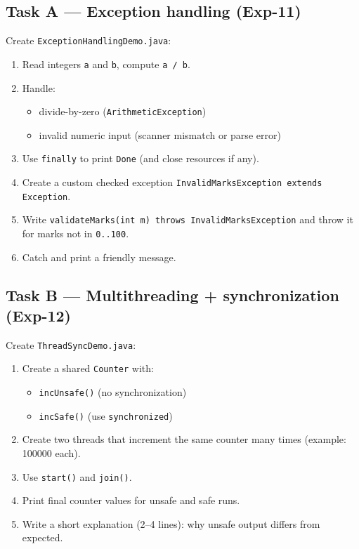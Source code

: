 \documentclass[11pt]{article}
\begin{document}
\subsection{Task A --- Exception handling (Exp-11)}
Create \texttt{ExceptionHandlingDemo.java}:
\begin{enumerate}[leftmargin=*]
  \item Read integers \texttt{a} and \texttt{b}, compute \texttt{a / b}.
  \item Handle:
  \begin{itemize}[leftmargin=*]
    \item divide-by-zero (\texttt{ArithmeticException})
    \item invalid numeric input (scanner mismatch or parse error)
  \end{itemize}
  \item Use \texttt{finally} to print \texttt{Done} (and close resources if any).
  \item Create a custom checked exception \texttt{InvalidMarksException extends Exception}.
  \item Write \texttt{validateMarks(int m) throws InvalidMarksException} and throw it for marks not in \texttt{0..100}.
  \item Catch and print a friendly message.
\end{enumerate}

\subsection{Task B --- Multithreading + synchronization (Exp-12)}
Create \texttt{ThreadSyncDemo.java}:
\begin{enumerate}[leftmargin=*]
  \item Create a shared \texttt{Counter} with:
  \begin{itemize}[leftmargin=*]
    \item \texttt{incUnsafe()} (no synchronization)
    \item \texttt{incSafe()} (use \texttt{synchronized})
  \end{itemize}
  \item Create two threads that increment the same counter many times (example: 100000 each).
  \item Use \texttt{start()} and \texttt{join()}.
  \item Print final counter values for unsafe and safe runs.
  \item Write a short explanation (2--4 lines): why unsafe output differs from expected.
\end{enumerate}
\end{document}
